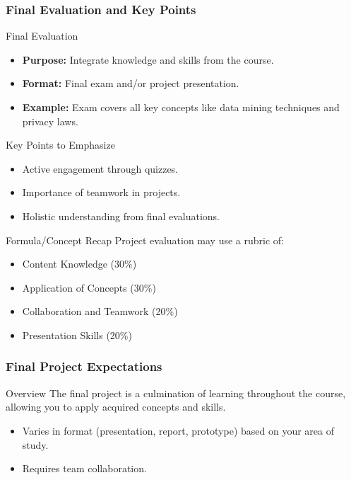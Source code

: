 \documentclass[aspectratio=169]{beamer}
\begin{document}
\begin{frame}[fragile]
    \frametitle{Final Evaluation and Key Points}
    \begin{block}{Final Evaluation}
        \begin{itemize}
            \item \textbf{Purpose:} Integrate knowledge and skills from the course.
            \item \textbf{Format:} Final exam and/or project presentation.
            \item \textbf{Example:} Exam covers all key concepts like data mining techniques and privacy laws.
        \end{itemize}
    \end{block}
    
    \vfill
    
    \begin{block}{Key Points to Emphasize}
        \begin{itemize}
            \item Active engagement through quizzes.
            \item Importance of teamwork in projects.
            \item Holistic understanding from final evaluations.
        \end{itemize}
        
        \begin{block}{Formula/Concept Recap}
            Project evaluation may use a rubric of:
            \begin{itemize}
                \item Content Knowledge (30\%)
                \item Application of Concepts (30\%)
                \item Collaboration and Teamwork (20\%)
                \item Presentation Skills (20\%)
            \end{itemize}
        \end{block}
    \end{block}
\end{frame}

\begin{frame}[fragile]
    \frametitle{Final Project Expectations}
    \begin{block}{Overview}
        The final project is a culmination of learning throughout the course, allowing you to apply acquired concepts and skills.
        \begin{itemize}
            \item Varies in format (presentation, report, prototype) based on your area of study.
            \item Requires team collaboration.
        \end{itemize}
    \end{block}
\end{frame}
\end{document}
